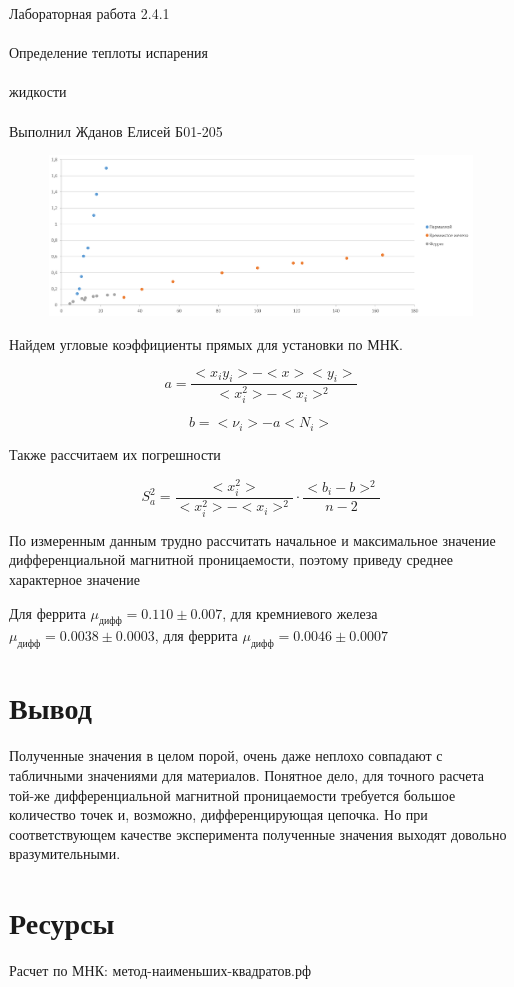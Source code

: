 \documentclass{astroedu-lab}
\begin{document}
\begin{problem}{\huge Лабораторная работа 2.4.1\\\\Определение теплоты испарения\\\\жидкости\\\\Выполнил Жданов Елисей Б01-205}
\begin{figure}[!h]
	\centering
	\includegraphics[width=1\textwidth]{график.png}
	\label{fig:boiler}
\end{figure}

Найдем угловые коэффициенты прямых для установки по МНК.

\[
	a = \frac{<x_i y_i> - < x > < y_i >}{< x_i^2> - < x_i >^2}
\]

\[
	b = < \nu_i > - a < N_i >
\]

Также рассчитаем их погрешности

\begin{equation}
	S_a^2 = \frac{< x_i^2>}{< x_i^2 > - < x_i >^2} \cdot \frac{<  b_i - b > ^2}{n - 2}
\end{equation}

По измеренным данным трудно рассчитать начальное и максимальное значение дифференциальной магнитной проницаемости, поэтому приведу среднее характерное значение

Для феррита $\mu_\text{дифф} = 0.110 \pm  0.007$, для кремниевого железа $\mu_\text{дифф} = 0.0038 \pm 0.0003$, для феррита $\mu_\text{дифф} = 0.0046 \pm 0.0007$

\section{Вывод}

Полученные значения в целом порой, очень даже неплохо совпадают с табличными значениями для материалов. Понятное дело, для точного расчета той-же дифференциальной магнитной проницаемости требуется большое количество точек и, возможно, дифференцирующая цепочка. Но при соответствующем качестве эксперимента полученные значения выходят довольно вразумительными.

\section{Ресурсы}

Расчет по МНК: метод-наименьших-квадратов.рф


\end{problem}
\end{document}
